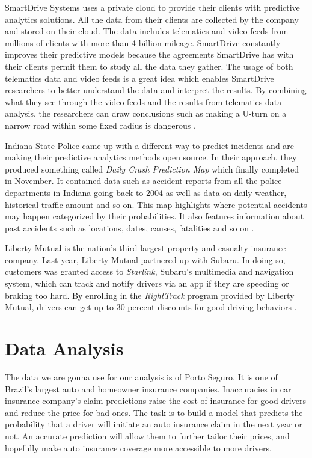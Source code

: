 SmartDrive Systems uses a private cloud to provide their clients with predictive analytics solutions. All the data from their clients are collected by the company and stored on their cloud. The data includes telematics and video feeds from millions of clients with more than 4 billion mileage. SmartDrive constantly improves their predictive models because the agreements SmartDrive has with their clients permit them to study all the data they gather. The usage of both telematics data and video feeds is a great idea which enables SmartDrive researchers to better understand the data and interpret the results. By combining what they see through the video feeds and the results from telematics data analysis, the researchers can draw conclusions such as making a U-turn on a narrow road within some fixed radius is dangerous \cite{Banker2016accident}.

Indiana State Police came up with a different way to predict incidents and are making their predictive analytics methods open source. In their approach, they produced something called {\em Daily Crash Prediction Map} which finally completed in November. It contained data such as accident reports from all the police departments in Indiana going back to 2004 as well as data on daily weather, historical traffic amount and so on. This map highlights where potential accidents may happen categorized by their probabilities. It also features information about past accidents such as locations, dates, causes, fatalities and so on \cite{Bergal2017sites}.

Liberty Mutual is the nation's third largest property and casualty insurance company. Last year, Liberty Mutual partnered up with Subaru. In doing so, customers was granted access to {\em Starlink}, Subaru's multimedia and navigation system, which can track and notify drivers via an app if they are speeding or braking too hard. By enrolling in the {\em RightTrack} program provided by Liberty Mutual, drivers can get up to 30 percent discounts for good driving behaviors \cite{Fung2016turn}. 

\section{Data Analysis}
The data we are gonna use for our analysis is of Porto Seguro. It is one of Brazil's largest auto and homeowner insurance companies. Inaccuracies in car insurance company's claim predictions raise the cost of insurance for good drivers and reduce the price for bad ones. The task is to build a model that predicts the probability that a driver will initiate an auto insurance claim in the next year or not. An accurate prediction will allow them to further tailor their prices, and hopefully make auto insurance coverage more accessible to more drivers. 

